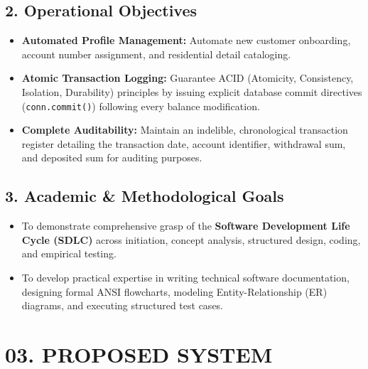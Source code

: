 \documentclass[12pt,a4paper]{article}
\begin{document}
\vspace{0.4em}
\subsection*{2. Operational Objectives}
\begin{itemize}
    \item \textbf{Automated Profile Management:} Automate new customer onboarding, account number assignment, and residential detail cataloging.
    \item \textbf{Atomic Transaction Logging:} Guarantee ACID (Atomicity, Consistency, Isolation, Durability) principles by issuing explicit database commit directives (\texttt{conn.commit()}) following every balance modification.
    \item \textbf{Complete Auditability:} Maintain an indelible, chronological transaction register detailing the transaction date, account identifier, withdrawal sum, and deposited sum for auditing purposes.
\end{itemize}

\vspace{0.4em}
\subsection*{3. Academic \& Methodological Goals}
\begin{itemize}
    \item To demonstrate comprehensive grasp of the \textbf{Software Development Life Cycle (SDLC)} across initiation, concept analysis, structured design, coding, and empirical testing.
    \item To develop practical expertise in writing technical software documentation, designing formal ANSI flowcharts, modeling Entity-Relationship (ER) diagrams, and executing structured test cases.
\end{itemize}

\clearpage

\hypertarget{sec:proposed}{}\label{sec:proposed}
\section*{03. PROPOSED SYSTEM}
\vspace{0.4em}
\end{document}
